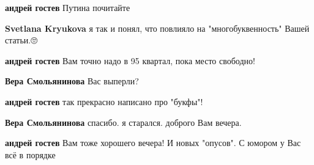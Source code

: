 \begin{itemize}
\begin{itemize}
\textbf{андрей гостев} Путина почитайте

 
\textbf{Svetlana Kryukova} я так и понял, что повлияло на "многобуквенность" Вашей статьи.🙄

 
\textbf{андрей гостев} Вам точно надо в 95 квартал, пока место свободно!🤣🤣🤣

 
\textbf{Вера Смольянинова} Вас выперли?\Laughey[1.0][white]

 
\textbf{андрей гостев} так прекрасно написано про "букфы"!

 
\textbf{Вера Смольянинова} спасибо. я старался. доброго Вам вечера.\Smiley[1.0][yellow]

 
\textbf{андрей гостев} Вам тоже хорошего вечера! И новых "опусов". С юмором у Вас всё в порядке
\end{itemize}


\end{itemize}
